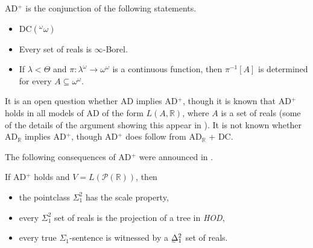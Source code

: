 \documentclass{book}%
\newcommand{\breals}{{^{\omega}}\omega}
\def\undertilde#1{{\baselineskip=0pt\vtop
  {\hbox{$#1$}\hbox{$\scriptscriptstyle\sim$}}}{}}
\begin{document}
\begin{definition} AD$^{+}$ is the
conjunction of the following statements.
\begin{itemize}
\item DC$(\breals)$
\item Every set of reals is $\infty$-Borel.
\item If $\lambda < \Theta$ and $\pi \colon \lambda^{\omega}
\to \omega^{\omega}$ is a continuous function, then $\pi^{-1}[A]$ is
determined for every $A \subseteq \omega^{\omega}$.
\end{itemize}
\end{definition}

It is an open question whether AD implies AD$^{+}$, though it is
known that AD$^{+}$ holds in all models of AD of the form $L(A,
\mathbb{R})$, where $A$ is a set of reals (some of the details of
the argument showing this appear in \cite{Jackson:handbook}). It is
not known whether AD$_{\mathbb{R}}$ implies AD$^{+}$, though
AD$^{+}$ does follow from AD$_{\mathbb{R}}$ + DC.

The following consequences of AD$^{+}$ were announced in
\cite{Woodin:1999}.


\begin{theorem}[{\rm ZF + DC}$(\breals)$] If\/ {\rm AD}$^{+}$ holds and
$V = L(\mathcal{P}(\mathbb{R}))$, then
\begin{itemize}
\item the pointclass $\Sigma^{2}_{1}$ has the scale property,
\item every $\Sigma^{2}_{1}$ set of reals is the projection
of a tree in \emph{HOD},
\item every true $\Sigma_{1}$-sentence is witnessed by a
$\undertilde{\Delta}^{2}_{1}$ set of reals.
\end{itemize}
\end{theorem}
\end{document}
